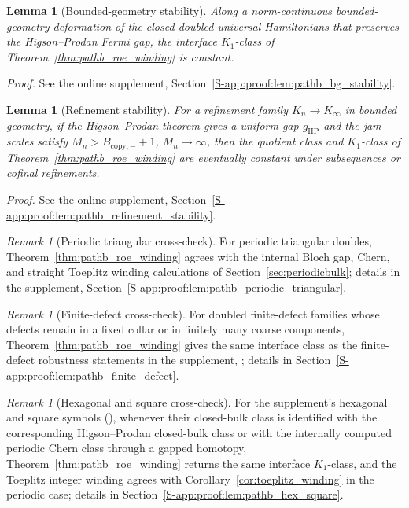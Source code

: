 \documentclass[11pt]{article}
\numberwithin{equation}{section}
\newtheorem{lemma}[theorem]{Lemma}
\theoremstyle{definition}
\theoremstyle{remark}
\newtheorem{remark}[theorem]{Remark}
\newcommand{\proofsuppref}[1]{%
  \par\noindent\emph{Proof.} See the online supplement, Section~\ref{S-#1}.\par\medskip
}
\begin{document}
\begin{lemma}[Bounded-geometry stability]\label{lem:pathb_bg_stability}
Along a norm-continuous bounded-geometry deformation of the closed doubled universal Hamiltonians
that preserves the Higson--Prodan Fermi gap, the interface \(K_1\)-class of
Theorem~\ref{thm:pathb_roe_winding} is constant.
\end{lemma}
\proofsuppref{app:proof:lem:pathb_bg_stability}

\begin{lemma}[Refinement stability]\label{lem:pathb_refinement_stability}
For a refinement family $K_n\to K_\infty$ in bounded geometry, if the Higson--Prodan theorem gives
a uniform gap $g_{\mathrm{HP}}$ and the jam scales satisfy $M_n>B_{\mathrm{copy},-}+1$,
$M_n\to\infty$, then the quotient class and \(K_1\)-class of
Theorem~\ref{thm:pathb_roe_winding} are eventually constant under subsequences or cofinal
refinements.
\end{lemma}
\proofsuppref{app:proof:lem:pathb_refinement_stability}

\begin{remark}[Periodic triangular cross-check]\label{lem:pathb_periodic_triangular}
For periodic triangular doubles, Theorem~\ref{thm:pathb_roe_winding} agrees with the internal
Bloch gap, Chern, and straight Toeplitz winding calculations of
Section~\ref{sec:periodicbulk}; details in the supplement,
Section~\ref{S-app:proof:lem:pathb_periodic_triangular}.
\end{remark}

\begin{remark}[Finite-defect cross-check]\label{lem:pathb_finite_defect}
For doubled finite-defect families whose defects remain in a fixed collar or in finitely many
coarse components, Theorem~\ref{thm:pathb_roe_winding} gives the same interface class
as the finite-defect robustness statements in the supplement,
; details in
Section~\ref{S-app:proof:lem:pathb_finite_defect}.
\end{remark}

\begin{remark}[Hexagonal and square cross-check]\label{lem:pathb_hex_square}
For the supplement's hexagonal and square symbols (), whenever
their closed-bulk class is identified with the corresponding Higson--Prodan closed-bulk class or
with the internally computed periodic Chern class through a gapped homotopy,
Theorem~\ref{thm:pathb_roe_winding} returns the same interface \(K_1\)-class, and the
Toeplitz integer winding agrees with Corollary~\ref{cor:toeplitz_winding} in the periodic
case; details in Section~\ref{S-app:proof:lem:pathb_hex_square}.
\end{remark}
\end{document}
